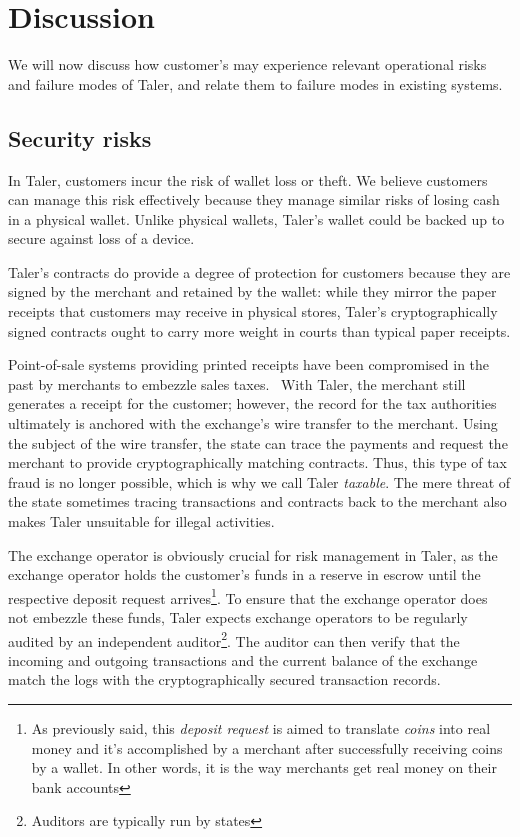 \documentclass{IEEEtran}
\begin{document}
\section{Discussion}

We will now discuss how customer's may experience relevant operational
risks and failure modes of Taler, and relate them to failure modes
in existing systems.

\subsection{Security risks}

In Taler, customers incur the risk of wallet loss or theft.  We
believe customers can manage this risk effectively because they manage
similar risks of losing cash in a physical wallet.  Unlike physical
wallets, Taler's wallet could be backed up to secure against loss of a
device.

Taler's contracts do provide a degree of protection for customers
because they are signed by the merchant and retained by the wallet:
while they mirror the paper receipts that customers may receive in
physical stores, Taler's cryptographically signed contracts ought to
carry more weight in courts than typical paper receipts.

Point-of-sale systems providing printed receipts have been compromised
in the past by merchants to embezzle sales
taxes.~\cite{munichicecream} With Taler, the merchant still generates
a receipt for the customer; however, the record for the tax
authorities ultimately is anchored with the exchange's wire transfer
to the merchant.  Using the subject of the wire transfer, the state
can trace the payments and request the merchant to provide
cryptographically matching contracts.  Thus, this type of tax
fraud is no longer possible, which is why we call Taler {\em
taxable}.  The mere threat of the state sometimes tracing transactions
and contracts back to the merchant also makes Taler unsuitable for
illegal activities.

The exchange operator is obviously crucial for risk management in
Taler, as the exchange operator holds the customer's funds in a
reserve in escrow until the respective deposit request arrives\footnote{As
previously said, this {\it deposit request} is aimed to translate {\it coins}
into real money and it's accomplished by a merchant after successfully
receiving coins by a wallet. In other words, it is the way merchants get
real money on their bank accounts}. To ensure that the exchange operator
does not embezzle these funds, Taler expects exchange operators to be
regularly audited by an independent auditor\footnote{Auditors are typically
run by states}.  The auditor can then verify that the incoming and outgoing
transactions and the current balance of the exchange match the logs
with the cryptographically secured transaction records.
\end{document}

